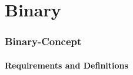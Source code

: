 \section{Binary}

\begin{frame}
	\frametitle{Binary-Concept}
	\framesubtitle{Requirements and Definitions}
\end{frame}